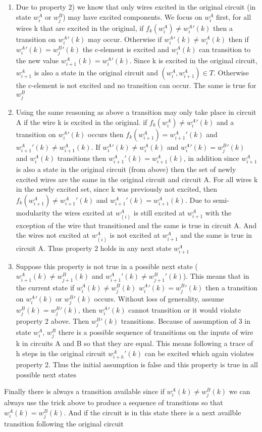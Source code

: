 \documentclass{article}
\begin{document}
\begin{enumerate} %
\item  Due to property 2) we know that only wires excited in the original circuit (in state $w_i^A$ or $w_j^B$) may have excited components.  We focus on $w_i^A$ first, for all wires k that are excited in the original, 
if $f_k(w_i^A)\neq w_i^A'(k)$ then a transition on $w_i^A'(k)$ may occur.  Otherwise if $w_i^A'(k) \neq w_i^A(k)$ then if $w_i^A'(k) = w_j^B'(k)$ the c-element is excited and $w_i^A(k)$ can transition to the new value $w_{i+1}^A(k)=w_i^A'(k)$. 
Since k is excited in the original circuit, $w_{i+1}^A$ is also a state in the original circuit and $(w_
i^A, w_{i+1}^A)\in T$.  Otherwise the c-element is not excited and no transition can occur. The same is true for $w_j^B$
\item  Using the same reasoning as above a transition may only take place in circuit A if the wire k is excited in the original.   if $f_k(w_i^A)\neq w_i^A'(k)$ and a transition on $w_i^A'(k)$ occurs then $f_k(w_{i+1}^A)= w_{i+1}^A'(k)$ and $w_{i+1}^A'(k)\neq w_{i+1}^A(k)$.  
If $w_i^A'(k) \neq w_i^A(k)$ and $w_i^A'(k) = w_j^B'(k)$ and $w_i^A(k)$ transitions then  $w_{i+1}^A'(k)= w_{i+1}^A(k)$, in addition since $w_{i+1}^A$ is also a state in the original circuit (from above) then the set of newly excited wires are the same in the original circuit and circuit A.  
For all wires k in the newly excited set, since k was previously not excited, then $f_k(w_{i+1}^A)\neq w_{i+1}^A'(k)$ and $w_{i+1}^A'(k)= w_{i+1}^A(k)$.  Due to semi-modularity the wires excited at $w_(i)^A$ is still excited at $w_{i+1}^A$ with the exception of the wire that transitioned and the same is true in circuit A.
And the wires not excited at $w_(i)^A$ is not excited at $w_{i+1}^A$ and the same is true in circuit A.  Thus property 2 holds in any next state $w_{i+1}^A$
\item  Suppose this property is not true in a possible next state ($w_{i+1}^A(k)\neq w_{j+1}^B(k)$ and $w_{i+1}^A'(k)\neq w_{j+1}^B'(k)$).  This means that in the current state if $w_i^A(k)\neq w_j^B(k)$ $w_i^A'(k)=w_j^B'(k)$ then a transition on $w_i^A'(k)$ or $w_j^B'(k)$ occurs.  Without loss of generality, assume $w_j^B(k)=w_j^B'(k)$, then $w_i^A'(k)$ cannot transition or it would violate property 2 above.  Then $w_j^B'(k)$ transitions.  Because of assumption of 3 in state $w_i^A$, $w_j^B$ there is a possible sequence of transitions on the inputs of wire k in circuits A and B so that they are equal.  This means following a trace of h steps in the original circuit  $w_{i+h}^A'(k)$ can be excited which again violates property 2.  Thus the initial assumption is false and this property is true in all possible next states 
\end{enumerate}
Finally there is always a transition available since if $w_i^A(k)\neq w_j^B(k)$ we can always use the trick above to produce a sequence of transitions so that $w_i^A(k)= w_j^B(k)$.  And if the circuit is in this state there is a next availble transition following the original circuit
\end{document}
